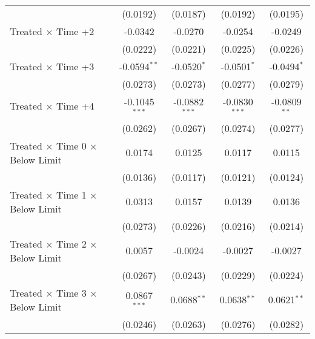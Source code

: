 \begin{tabular*}{0.8\textwidth}{@{\extracolsep{\fill}}lcccc}
                                                    & (0.0192)        & (0.0187)              & (0.0192)              & (0.0195)\\   
    Treated $\times$ Time +2                        & -0.0342         & -0.0270               & -0.0254               & -0.0249\\   
                                                    & (0.0222)        & (0.0221)              & (0.0225)              & (0.0226)\\   
    Treated $\times$ Time +3                        & -0.0594$^{**}$  & -0.0520$^{*}$         & -0.0501$^{*}$         & -0.0494$^{*}$\\   
                                                    & (0.0273)        & (0.0273)              & (0.0277)              & (0.0279)\\   
    Treated $\times$ Time +4                        & -0.1045$^{***}$ & -0.0882$^{***}$       & -0.0830$^{***}$       & -0.0809$^{**}$\\   
                                                    & (0.0262)        & (0.0267)              & (0.0274)              & (0.0277)\\   
   Treated $\times$ Time 0 $\times$ Below Limit     & 0.0174          & 0.0125                & 0.0117                & 0.0115\\   
                                                    & (0.0136)        & (0.0117)              & (0.0121)              & (0.0124)\\   
   Treated $\times$ Time 1 $\times$ Below Limit     & 0.0313          & 0.0157                & 0.0139                & 0.0136\\   
                                                    & (0.0273)        & (0.0226)              & (0.0216)              & (0.0214)\\   
   Treated $\times$ Time 2 $\times$ Below Limit     & 0.0057          & -0.0024               & -0.0027               & -0.0027\\   
                                                    & (0.0267)        & (0.0243)              & (0.0229)              & (0.0224)\\   
   Treated $\times$ Time 3 $\times$ Below Limit     & 0.0867$^{***}$  & 0.0688$^{**}$         & 0.0638$^{**}$         & 0.0621$^{**}$\\   
                                                    & (0.0246)        & (0.0263)              & (0.0276)              & (0.0282)\\   

\end{tabular*}
